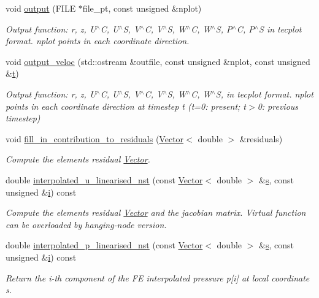 \begin{DoxyCompactItemize}
void \hyperlink{classoomph_1_1LinearisedNavierStokesEquations_a526bc349330e22ae332c75d0b9fd75df}{output} (F\+I\+LE $\ast$file\+\_\+pt, const unsigned \&nplot)
\begin{DoxyCompactList}\small\item\em Output function\+: r, z, U$^\wedge$C, U$^\wedge$S, V$^\wedge$C, V$^\wedge$S, W$^\wedge$C, W$^\wedge$S, P$^\wedge$C, P$^\wedge$S in tecplot format. nplot points in each coordinate direction. \end{DoxyCompactList}\item 
void \hyperlink{classoomph_1_1LinearisedNavierStokesEquations_a4eaf26ee7af0a56c20a11d378414a66f}{output\+\_\+veloc} (std\+::ostream \&outfile, const unsigned \&nplot, const unsigned \&\hyperlink{cfortran_8h_af6f0bd3dc13317f895c91323c25c2b8f}{t})
\begin{DoxyCompactList}\small\item\em Output function\+: r, z, U$^\wedge$C, U$^\wedge$S, V$^\wedge$C, V$^\wedge$S, W$^\wedge$C, W$^\wedge$S, in tecplot format. nplot points in each coordinate direction at timestep t (t=0\+: present; t$>$0\+: previous timestep) \end{DoxyCompactList}\item 
void \hyperlink{classoomph_1_1LinearisedNavierStokesEquations_a261b7d496e778aba3d43393bc955a36a}{fill\+\_\+in\+\_\+contribution\+\_\+to\+\_\+residuals} (\hyperlink{classoomph_1_1Vector}{Vector}$<$ double $>$ \&residuals)
\begin{DoxyCompactList}\small\item\em Compute the element\textquotesingle{}s residual \hyperlink{classoomph_1_1Vector}{Vector}. \end{DoxyCompactList}\item 
double \hyperlink{classoomph_1_1LinearisedNavierStokesEquations_adbff2e60907cae4aa41f65f5d1d72998}{interpolated\+\_\+u\+\_\+linearised\+\_\+nst} (const \hyperlink{classoomph_1_1Vector}{Vector}$<$ double $>$ \&\hyperlink{cfortran_8h_ab7123126e4885ef647dd9c6e3807a21c}{s}, const unsigned \&\hyperlink{cfortran_8h_adb50e893b86b3e55e751a42eab3cba82}{i}) const
\begin{DoxyCompactList}\small\item\em Compute the element\textquotesingle{}s residual \hyperlink{classoomph_1_1Vector}{Vector} and the jacobian matrix. Virtual function can be overloaded by hanging-\/node version. \end{DoxyCompactList}\item 
double \hyperlink{classoomph_1_1LinearisedNavierStokesEquations_ab35cfe7f63c8cd7f14217783e95889ee}{interpolated\+\_\+p\+\_\+linearised\+\_\+nst} (const \hyperlink{classoomph_1_1Vector}{Vector}$<$ double $>$ \&\hyperlink{cfortran_8h_ab7123126e4885ef647dd9c6e3807a21c}{s}, const unsigned \&\hyperlink{cfortran_8h_adb50e893b86b3e55e751a42eab3cba82}{i}) const
\begin{DoxyCompactList}\small\item\em Return the i-\/th component of the FE interpolated pressure p\mbox{[}i\mbox{]} at local coordinate s. \end{DoxyCompactList}\end{DoxyCompactItemize}
